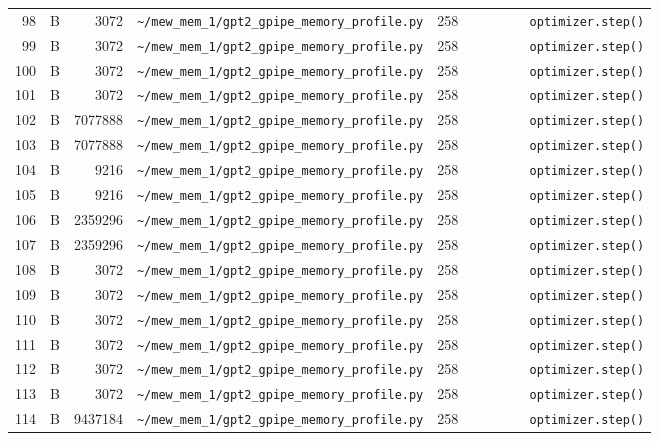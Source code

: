 \documentclass{article}
\begin{document}
\begin{longtable}{r l r p{6.5cm} r p{7.0cm}}
98 & B & 3072 & \lstinline|~/mew_mem_1/gpt2_gpipe_memory_profile.py| & 258 & \lstinline|        optimizer.step()| \\
99 & B & 3072 & \lstinline|~/mew_mem_1/gpt2_gpipe_memory_profile.py| & 258 & \lstinline|        optimizer.step()| \\
100 & B & 3072 & \lstinline|~/mew_mem_1/gpt2_gpipe_memory_profile.py| & 258 & \lstinline|        optimizer.step()| \\
101 & B & 3072 & \lstinline|~/mew_mem_1/gpt2_gpipe_memory_profile.py| & 258 & \lstinline|        optimizer.step()| \\
102 & B & 7077888 & \lstinline|~/mew_mem_1/gpt2_gpipe_memory_profile.py| & 258 & \lstinline|        optimizer.step()| \\
103 & B & 7077888 & \lstinline|~/mew_mem_1/gpt2_gpipe_memory_profile.py| & 258 & \lstinline|        optimizer.step()| \\
104 & B & 9216 & \lstinline|~/mew_mem_1/gpt2_gpipe_memory_profile.py| & 258 & \lstinline|        optimizer.step()| \\
105 & B & 9216 & \lstinline|~/mew_mem_1/gpt2_gpipe_memory_profile.py| & 258 & \lstinline|        optimizer.step()| \\
106 & B & 2359296 & \lstinline|~/mew_mem_1/gpt2_gpipe_memory_profile.py| & 258 & \lstinline|        optimizer.step()| \\
107 & B & 2359296 & \lstinline|~/mew_mem_1/gpt2_gpipe_memory_profile.py| & 258 & \lstinline|        optimizer.step()| \\
108 & B & 3072 & \lstinline|~/mew_mem_1/gpt2_gpipe_memory_profile.py| & 258 & \lstinline|        optimizer.step()| \\
109 & B & 3072 & \lstinline|~/mew_mem_1/gpt2_gpipe_memory_profile.py| & 258 & \lstinline|        optimizer.step()| \\
110 & B & 3072 & \lstinline|~/mew_mem_1/gpt2_gpipe_memory_profile.py| & 258 & \lstinline|        optimizer.step()| \\
111 & B & 3072 & \lstinline|~/mew_mem_1/gpt2_gpipe_memory_profile.py| & 258 & \lstinline|        optimizer.step()| \\
112 & B & 3072 & \lstinline|~/mew_mem_1/gpt2_gpipe_memory_profile.py| & 258 & \lstinline|        optimizer.step()| \\
113 & B & 3072 & \lstinline|~/mew_mem_1/gpt2_gpipe_memory_profile.py| & 258 & \lstinline|        optimizer.step()| \\
114 & B & 9437184 & \lstinline|~/mew_mem_1/gpt2_gpipe_memory_profile.py| & 258 & \lstinline|        optimizer.step()| \\

\end{longtable}
\end{document}
